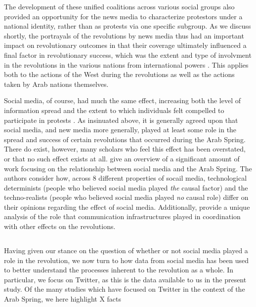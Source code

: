 The development of these unified coalitions across various social groups also provided an opportunity for the news media to characterize protestors under a national identity, rather than as protests via one specific subgroup.  As we discuss shortly, the portrayals of the revolutions by news media thus had an important impact on revolutionary outcomes in that their coverage ultimately influenced a final factor in revolutionary success, which was the extent and type of involvment in the revolutions in the various nations from international powers \cite{goldstone_bringing_2013,comunello_will_2012}.  This applies both to the actions of the West during the revolutions as well as the actions taken by Arab nations themselves.  

Social media, of course, had much the same effect, increasing both the level of information spread and the extent to which individuals felt compelled to participate in protests \cite{tufekci_social_2012,wolfsfeld_social_2013,bellin_reconsidering_2012}. As insinuated above, it is generally agreed upon that social media, and new media more generally, played at least some role in the spread and success of certain revolutions that occurred during the Arab Spring.  There do exist, however, many scholars who feel this effect has been overstated, or that no such effect exists at all. \cite{comunello_will_2012} give an overview of a significant amount of work focusing on the relationship between social media and the Arab Spring.  The authors consider how, across 8 different properties of socail media, technological determinists (people who believed social media played \emph{the} causal factor) and the techno-realists (people who believed social media played \emph{no} causal role) differ on their opinions regarding the effect of social media.  Additionally, \cite{hussain_what_2013} provide a unique analysis of the role that communication infrastructures played in coordination with other effects on the revolutions.

\subsection{}

Having given our stance on the question of whether or not social media played a role in the revolution, we now turn to how data from social media has been used to better understand the processes inherent to the revolution as a whole.  In particular, we focus on Twitter, as this is the data available to us in the present study.  Of the many studies which have focused on Twitter in the context of the Arab Spring, we here highlight X facts

